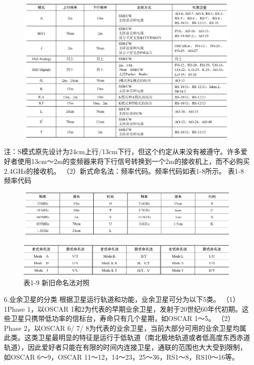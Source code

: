 \documentclass[12pt,UTF8]{ctexbook}
\begin{document}
\begin{figure}[htbp]
	\centering
	\includegraphics[width=0.7\linewidth]{89}
	\caption{}
	\label{fig:1}
\end{figure}

注：S模式原先设计为24cm上行/13cm下行，但这个约定从来没有被遵守。许多爱好者使用13cm～2m的变频器来将下行信号转换到一个2m的接收机上，而不必购买2.4GHz的接收机。
（2）新式命名法：频率代码。频率代码如表1-8所示。
表1-8 频率代码

\begin{figure}[htbp]
	\centering
	\includegraphics[width=0.7\linewidth]{90}
	\caption{}
	\label{fig:1}
\end{figure}

\begin{figure}[htbp]
	\centering
	\includegraphics[width=0.7\linewidth]{91}
	\caption{表1-9 新旧命名法对照}
	\label{fig:1}
\end{figure}

6.业余卫星的分类
根据卫星运行轨道和功能，业余卫星可分为以下5类。
（1）1Phase 1，以OSCAR 1和2为代表的早期业余卫星，发射于20世纪60年代初期。这些卫星只携带低功率的信标台，寿命只有几个星期，如OSCAR 1～5。
（2）Phase 2，以OSCAR 6/ 7/ 8为代表的业余卫星，当前大部分可用的业余卫星均属此类。这类卫星最明显的特征是运行于低轨道（南北极地轨道或者低高度东西赤道轨道），因此爱好者只能在有限的时间内连接卫星，通联的范围也大大受到限制，如OSCAR 6～9，OSCAR 11～12，14～23，25～36，RS1～8，RS10～16等。
\end{document}
